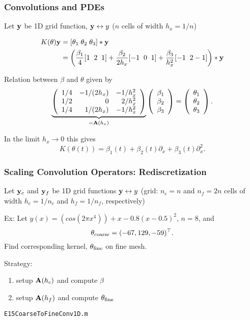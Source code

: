 \documentclass[12pt,fleqn,handout]{beamer}
\begin{document}
\begin{frame}\frametitle{Convolutions and PDEs}

Let ${\bf y}$ be 1D grid function, ${\bf y} \leftrightarrow y$ ($n$ cells of width $h_x=1/n$)

\begin{align*}
K(\theta){\bf y} & = [\theta_1\; \theta_2\; \theta_3] * {\bf y}  \\
 & =\left(\frac{\beta_1}{4} [1\;\; 2\;\; 1]  + \frac{\beta_2}{2h_x} [-1\;\; 0 \;\; 1] + \frac{\beta_3}{h_x^2}[-1\;\; 2 -1] \right) * {\bf y}
\end{align*}

\pause
Relation between $\beta$ and $\theta$ given by
$$
	\underbrace{
	\left( 
		\begin{array}{rrr}
			1/4 & -1/(2h_x) & -1/h_x^2 \\
			1/2 & 0            & 2/h_x^2  \\
			1/4 & 1/(2h_x)  & -1/h_x^2
		\end{array}
	\right)}_{={\bf A}(h_x)}
	\left( 
		\begin{array}{r}
			\beta_1 \\ 
			\beta_2 \\
			\beta_3
		\end{array}
	\right)
	=
	\left( 
		\begin{array}{r}
			\theta_1 \\ 
			\theta_2 \\
			\theta_3
		\end{array}
	\right).
$$

\bigskip
\pause

In the limit $h_x \to 0$ this gives
$$
	K(\theta(t)) = \beta_1(t) + \beta_2(t) \partial_x + \beta_3(t) \partial_x^2.
$$
\pause

\end{frame}

\begin{frame}
	\frametitle{Scaling Convolution Operators: Rediscretization}
	
	Let ${\bf y}_c$ and ${\bf y}_f$ be 1D grid functions ${\bf y} \leftrightarrow y$ (grid: $n_c=n$ and $n_f=2n$ cells of width $h_c=1/n_c$ and $h_f = 1/n_f$, respectively)
	
	\bigskip
	\pause
	
	Ex: Let $y(x) = (cos(2 \pi x^4))+x-0.8(x-0.5)^2$, $n = 8$, and
	$$
		\theta_{\rm coarse} = (-67,  129, -59)^\top.
	$$
	Find corresponding kernel, $\theta_{\rm fine}$  on fine mesh.
	
	\bigskip
	\pause
	
	Strategy:
	\begin{enumerate}
		\item setup ${\bf A}(h_c)$ and compute $\beta$
		\item setup ${\bf A}(h_f)$ and compute $\theta_{\rm fine}$
	\end{enumerate}
	
	\bigskip

	\begin{center}
		\texttt{E15CoarseToFineConv1D.m}
	\end{center}
	
\end{frame}
\end{document}
